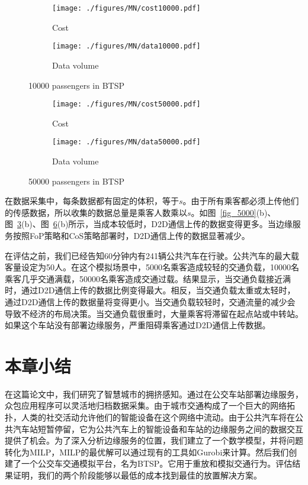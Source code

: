 \begin{figure}[!h]
  \centering
  \begin{subfigure}[b]{0.45\linewidth}
    \texttt{[image: ./figures/MN/cost10000.pdf]}
    \label{fig_cost10000}
    \caption{Cost}
  \end{subfigure}
  \begin{subfigure}[b]{0.45\linewidth}
    \texttt{[image: ./figures/MN/data10000.pdf]}
    \label{fig_data10000}
    \caption{Data volume}
  \end{subfigure}
  \caption{10000 passengers in BTSP}
  \label{fig_10000}
\end{figure}

\begin{figure}[!h]
  \centering
  \begin{subfigure}[b]{0.45\linewidth}
    \texttt{[image: ./figures/MN/cost50000.pdf]}
    \label{fig_cost50000}
    \caption{Cost}
  \end{subfigure}
  \begin{subfigure}[b]{0.45\linewidth}
    \texttt{[image: ./figures/MN/data50000.pdf]}
    \label{fig_data50000}
    \caption{Data volume}
  \end{subfigure}
  \caption{50000 passengers in BTSP}
  \label{fig_50000}
\end{figure}

在数据采集中，每条数据都有固定的体积，等于$s$。由于所有乘客都必须上传他们的传感数据，所以收集的数据总量是乘客人数乘以$s$。如图~\ref{fig_5000}(b)、图~\ref{fig_10000}(b)、图~\ref{fig_50000}(b)所示，当成本较低时，D2D通信上传的数据变得更多。当边缘服务按照FoP策略和CoS策略部署时，D2D通信上传的数据显著减少。

在评估之前，我们已经告知60分钟内有241辆公共汽车在行驶。公共汽车的最大载客量设定为50人。在这个模拟场景中，5000名乘客造成较轻的交通负载，10000名乘客几乎交通满载，50000名乘客造成交通过载。结果显示，当交通负载接近满时，通过D2D通信上传的数据比例变得最大。相反，当交通负载太重或太轻时，通过D2D通信上传的数据量将变得更小。当交通负载较轻时，交通流量的减少会导致不经济的布局决策。当交通负载很重时，大量乘客将滞留在起点站或中转站。如果这个车站没有部署边缘服务，严重阻碍乘客通过D2D通信上传数据。

\section{本章小结}

在这篇论文中，我们研究了智慧城市的拥挤感知。通过在公交车站部署边缘服务，众包应用程序可以灵活地归档数据采集。由于城市交通构成了一个巨大的网络拓扑，人类的社交活动允许他们的智能设备在这个网络中流动。由于公共汽车将在公共汽车站短暂停留，它为公共汽车上的智能设备和车站的边缘服务之间的数据交互提供了机会。为了深入分析边缘服务的位置，我们建立了一个数学模型，并将问题转化为MILP，MILP的最优解可以通过现有的工具如Gurobi来计算。然后我们创建了一个公交车交通模拟平台，名为BTSP。它用于重放和模拟交通行为。评估结果证明，我们的两个阶段能够以最低的成本找到最佳的放置解决方案。

